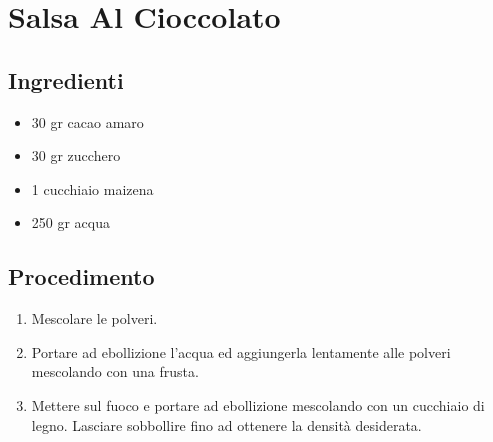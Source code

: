 \section{Salsa Al Cioccolato}
\subsection{Ingredienti}
\begin{itemize}
\item 30 gr cacao amaro  
\item 30 gr zucchero  
\item 1 cucchiaio maizena  
\item 250 gr acqua
\end{itemize}
\subsection{Procedimento}
\begin{enumerate}
\item  Mescolare le polveri.   
\item  Portare ad ebollizione l'acqua ed aggiungerla lentamente alle polveri mescolando con una frusta.  
\item  Mettere sul fuoco e portare ad ebollizione mescolando con un cucchiaio di legno. Lasciare sobbollire fino ad ottenere la densità desiderata.
\end{enumerate}
